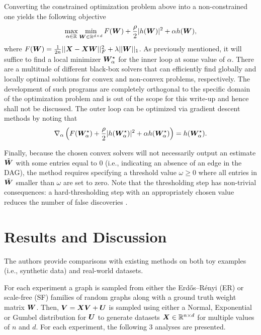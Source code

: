 \documentclass[11pt,a4paper]{article}
\begin{document}
Converting the constrained optimization problem above into a non-constrained one yields the following objective
\begin{align}
    \max_{\alpha \in \mathbb{R}} \min_{{\bm{W}} \in \mathbb{R}^{d \times d}} F({\bm{W}}) + \frac{\rho}{2}|h({\bm{W}})|^2 + \alpha h({\bm{W}}),
\end{align}
where $F({\bm{W}}) = \frac{1}{2n} ||{\bm{X}} - {\bm{X}} {\bm{W}}||_{F}^{2} + \lambda ||{\bm{W}}||_1$.
As previously mentioned, it will suffice to find a local minimizer ${\bm{W}}^\star_\alpha$ for the inner loop at some value of $\alpha$. There are a multitude of different black-box solvers that can efficiently find globally and locally optimal solutions for convex and non-convex problems, respectively. The development of such programs are completely orthogonal to the specific domain of the optimization problem and is out of the scope for this write-up and hence shall not be discussed. The outer loop can be optimized via gradient descent methods by noting that
\begin{align}
    \nabla_\alpha \left( F({\bm{W}}^\star_\alpha) + \frac{\rho}{2}|h({\bm{W}}^\star_\alpha)|^2 + \alpha h({\bm{W}}^\star_\alpha) \right) = h({\bm{W}}^\star_\alpha).
\end{align}

Finally, because the chosen convex solvers will not necessarily output an estimate $\tilde{{\bm{W}}}$ with some entries equal to $0$ (i.e., indicating an absence of an edge in the DAG), the method requires specifying a threshold value $\omega \geq 0$ where all entries in $\tilde{{\bm{W}}}$ smaller than $\omega$ are set to zero. Note that the thresholding step has non-trivial consequences: a hard-thresholding step with an appropriately chosen value reduces the number of false discoveries \citep{zhou2009thresholding}. 

\section{Results and Discussion}
The authors provide comparisons with existing methods on both toy examples (i.e., synthetic data) and real-world datasets.

For each experiment a graph is sampled from either the Erdős–Rényi (ER) or scale-free (SF) families of random graphs along with a ground truth weight matrix ${\bm{W}}$. Then, ${\bm{V}} = {\bm{X}}{\bm{V}} + {\bm{U}}$ is sampled using either a Normal, Exponential or Gumbel distribution for ${\bm{U}}$ to generate datasets ${\bm{X}} \in \mathbb{R}^{n \times d}$ for multiple values of $n$ and $d$. For each experiment, the following 3 analyses are presented.
\end{document}
